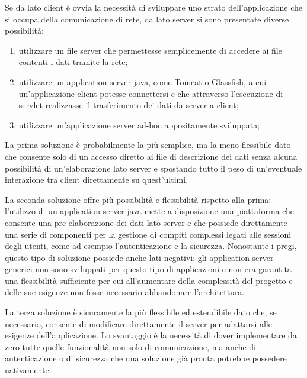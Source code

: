 
Se da lato client \`e ovvia la necessit\`a di sviluppare uno strato dell'applicazione che si occupa della comunicazione di rete, da lato server si sono presentate diverse possibilit\`a: 

\begin{enumerate}
	\item  utilizzare un file server che permettesse semplicemente di accedere ai file contenti i dati tramite la rete;
	\item  utilizzare un application server java, come Tomcat o Glassfish, a cui un'applicazione client potesse connettersi e che attraverso l'esecuzione di servlet realizzasse il trasferimento dei dati da server a client;
	\item  utilizzare un'applicazione server ad-hoc appositamente sviluppata;
\end{enumerate}

La prima soluzione \`e probabilmente la pi\`u semplice, ma la meno flessibile dato che consente solo di un accesso diretto ai file di descrizione dei dati senza alcuna possibilit\`a di un'elaborazione lato server e spostando tutto il peso di un'eventuale interazione tra client direttamente su quest'ultimi.

La seconda soluzione offre pi\`u possibilit\`a e flessibilit\`a rispetto alla prima: l'utilizzo di un application server java mette a disposizione una piattaforma che consente una pre-elaborazione dei dati lato server e che possiede direttamente una serie di componenti per la gestione di compiti complessi legati alle sessioni degli utenti, come ad esempio l'autenticazione e la sicurezza. Nonostante i pregi, questo tipo di soluzione possiede anche lati negativi: gli application server generici non sono sviluppati per questo tipo di applicazioni e non era garantita una flessibilit\`a sufficiente per cui all'aumentare della complessit\`a del progetto e delle sue esigenze non fosse necessario abbandonare l'architettura. 

La terza soluzione \`e sicuramente la pi\`u flessibile ed estendibile dato che, se necessario, consente di modificare direttamente il server per adattarsi alle esigenze dell'applicazione. Lo svantaggio \`e la necessit\`a di dover implementare da zero tutte quelle funzionalit\`a non solo di comunicazione, ma anche di autenticazione o di sicurezza che una soluzione gi\`a pronta potrebbe possedere nativamente.


